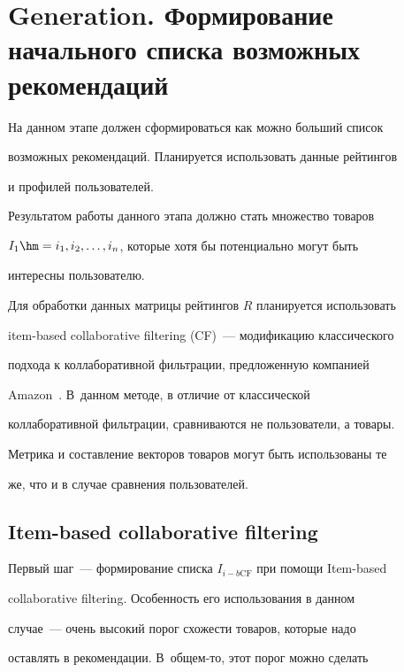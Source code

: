 \section{Generation. Формирование начального списка возможных рекомендаций}





На данном этапе должен сформироваться как можно больший список


возможных рекомендаций. Планируется использовать данные рейтингов


и профилей пользователей.





Результатом работы данного этапа должно стать множество товаров


$I_1\hm={\enum{i}{,}}$, которые хотя бы потенциально могут быть


интересны пользователю.





Для обработки данных матрицы рейтингов $R$ планируется использовать


item-based collaborative filtering (CF)~--- модификацию классического


подхода к коллаборативной фильтрации, предложенную компанией


Amazon~\cite{amazon}. В~данном методе, в отличие от классической


коллаборативной фильтрации, сравниваются не пользователи, а товары.


Метрика и составление векторов товаров могут быть использованы те


же, что и в случае сравнения пользователей.





\subsection{Item-based collaborative filtering}





Первый шаг~--- формирование списка  $I_{i-b\mathrm{CF}}$ при помощи Item-based


collaborative filtering. Особенность его использования в данном


случае~--- очень высокий порог схожести товаров, которые надо


оставлять в рекомендации. В~об\-щем-то, этот порог можно сделать


